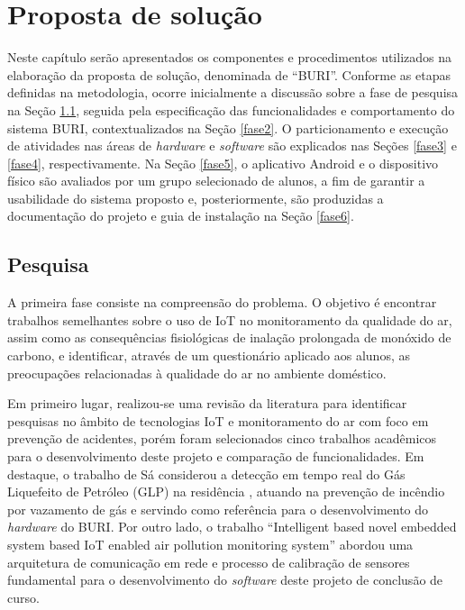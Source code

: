 \chapter{Proposta de solução}

Neste capítulo serão apresentados os componentes e procedimentos utilizados na elaboração da proposta de solução, denominada de ``BURI''. Conforme as
etapas definidas na metodologia, ocorre inicialmente a discussão sobre a fase de pesquisa na Seção \ref{fase1}, seguida pela especificação 
das funcionalidades e comportamento do sistema BURI, contextualizados na Seção \ref{fase2}. O particionamento e execução de atividades nas áreas de 
\textit{hardware} e \textit{software} são explicados nas Seções \ref{fase3} e \ref{fase4}, respectivamente. Na Seção \ref{fase5},  o aplicativo Android e o 
dispositivo físico são avaliados por um grupo selecionado de alunos, a fim de garantir a usabilidade do sistema proposto e, posteriormente, são produzidas a documentação 
do projeto e guia de instalação na Seção \ref{fase6}. 

\section{Pesquisa}\label{fase1}

A primeira fase consiste na compreensão do problema. O objetivo é encontrar trabalhos semelhantes sobre o uso de IoT no monitoramento da qualidade do ar, assim 
como as consequências fisiológicas de inalação prolongada de monóxido de carbono, e identificar, através de um questionário aplicado aos alunos, as preocupações relacionadas 
à qualidade do ar no ambiente doméstico.

Em primeiro lugar, realizou-se uma revisão da literatura para identificar pesquisas no âmbito de tecnologias IoT e monitoramento do ar com foco 
em prevenção de acidentes, porém foram selecionados cinco trabalhos acadêmicos para o desenvolvimento deste projeto e comparação de funcionalidades. Em destaque, o 
trabalho de Sá considerou a detecção em tempo real do Gás Liquefeito de Petróleo (GLP) na residência \cite{uea-iot-deteccao-incendio}, atuando na prevenção de incêndio por vazamento de gás e servindo como referência para o desenvolvimento 
do \textit{hardware} do BURI. Por outro lado, o trabalho ``Intelligent based novel embedded system based IoT enabled
air pollution monitoring system'' \cite{tbRelacionado4NovelEmbeddedSystem} abordou uma arquitetura de comunicação em rede e processo de calibração de sensores
fundamental para o desenvolvimento do \textit{software} deste projeto de conclusão de curso.

